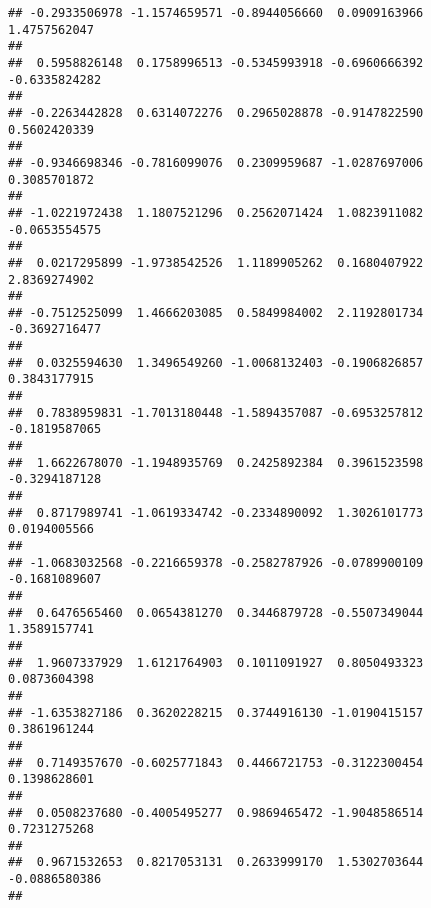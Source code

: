 \documentclass[]{article}
\begin{document}
\begin{verbatim}
## -0.2933506978 -1.1574659571 -0.8944056660  0.0909163966  1.4757562047 
##                                                                       
##  0.5958826148  0.1758996513 -0.5345993918 -0.6960666392 -0.6335824282 
##                                                                       
## -0.2263442828  0.6314072276  0.2965028878 -0.9147822590  0.5602420339 
##                                                                       
## -0.9346698346 -0.7816099076  0.2309959687 -1.0287697006  0.3085701872 
##                                                                       
## -1.0221972438  1.1807521296  0.2562071424  1.0823911082 -0.0653554575 
##                                                                       
##  0.0217295899 -1.9738542526  1.1189905262  0.1680407922  2.8369274902 
##                                                                       
## -0.7512525099  1.4666203085  0.5849984002  2.1192801734 -0.3692716477 
##                                                                       
##  0.0325594630  1.3496549260 -1.0068132403 -0.1906826857  0.3843177915 
##                                                                       
##  0.7838959831 -1.7013180448 -1.5894357087 -0.6953257812 -0.1819587065 
##                                                                       
##  1.6622678070 -1.1948935769  0.2425892384  0.3961523598 -0.3294187128 
##                                                                       
##  0.8717989741 -1.0619334742 -0.2334890092  1.3026101773  0.0194005566 
##                                                                       
## -1.0683032568 -0.2216659378 -0.2582787926 -0.0789900109 -0.1681089607 
##                                                                       
##  0.6476565460  0.0654381270  0.3446879728 -0.5507349044  1.3589157741 
##                                                                       
##  1.9607337929  1.6121764903  0.1011091927  0.8050493323  0.0873604398 
##                                                                       
## -1.6353827186  0.3620228215  0.3744916130 -1.0190415157  0.3861961244 
##                                                                       
##  0.7149357670 -0.6025771843  0.4466721753 -0.3122300454  0.1398628601 
##                                                                       
##  0.0508237680 -0.4005495277  0.9869465472 -1.9048586514  0.7231275268 
##                                                                       
##  0.9671532653  0.8217053131  0.2633999170  1.5302703644 -0.0886580386 
##                                                                       

\end{verbatim}
\end{document}
